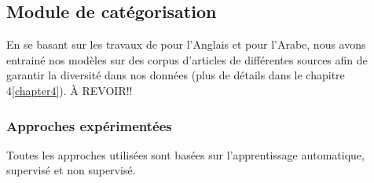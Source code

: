 

\subsection{Module de catégorisation}
En se basant sur les travaux de \cite{categorisation} pour l'Anglais et \cite{categorisation} pour l'Arabe, nous avons entrainé nos modèles sur des corpus d'articles de différentes sources afin de garantir la diversité dans nos données (plus de détails dans le chapitre 4\ref{chapter4}).
À REVOIR!!

\subsubsection{Approches expérimentées\label{approches}}
Toutes les approches utilisées sont basées sur l'apprentissage automatique, supervisé et non supervisé. 

